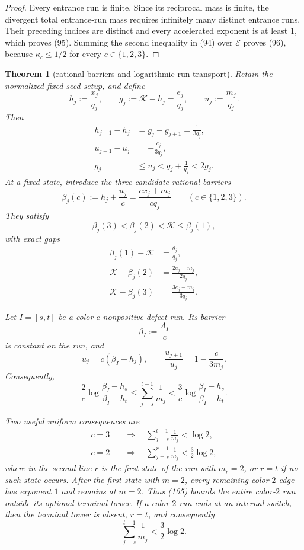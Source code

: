 \documentclass[11pt]{article}
\newtheorem{theorem}{Theorem}
\begin{document}
\begin{proof}
Every entrance run is finite.  Since its reciprocal mass is finite, the
divergent total entrance-run mass requires infinitely many distinct entrance
runs.  Their preceding indices are distinct and every accelerated exponent
is at least $1$, which proves (95).  Summing the second inequality in (94)
over $\mathcal E$ proves (96), because
$\kappa_c\leq1/2$ for every $c\in\{1,2,3\}$.
\end{proof}

\begin{theorem}[rational barriers and logarithmic run transport]
Retain the normalized fixed-seed setup, and define
\[
  h_j:=\frac{x_j}{q_j},
  \qquad
  g_j:=\mathcal K-h_j=\frac{e_j}{q_j},
  \qquad
  u_j:=\frac{m_j}{q_j}.
  \tag{97}
\]
Then
\[
\boxed{\begin{aligned}
  h_{j+1}-h_j&=g_j-g_{j+1}=\frac1{3q_j},\\
  u_{j+1}-u_j&=-\frac{c_j}{3q_j},\\
  g_j&\leq u_j<g_j+\frac1{q_j}<2g_j.
\end{aligned}}
\tag{98}
\]
At a fixed state, introduce the three candidate rational barriers
\[
  \beta_j(c):=h_j+\frac{u_j}{c}
  =\frac{cx_j+m_j}{cq_j}
  \qquad(c\in\{1,2,3\}).
  \tag{99}
\]
They satisfy
\[
\boxed{
  \beta_j(3)<\beta_j(2)<\mathcal K\leq\beta_j(1),}
\tag{100}
\]
with exact gaps
\[
\begin{aligned}
  \beta_j(1)-\mathcal K&=\frac{\theta_j}{q_j},\\
  \mathcal K-\beta_j(2)&=\frac{2e_j-m_j}{2q_j},\\
  \mathcal K-\beta_j(3)&=\frac{3e_j-m_j}{3q_j}.
\end{aligned}
\tag{101}
\]

Let $I=[s,t]$ be a color-$c$ nonpositive-defect run.  Its barrier
\[
  \beta_I:=\frac{\Lambda_I}{c}
  \tag{102}
\]
is constant on the run, and
\[
\boxed{
  u_j=c(\beta_I-h_j),
  \qquad
  \frac{u_{j+1}}{u_j}=1-\frac{c}{3m_j}.}
\tag{103}
\]
Consequently,
\[
\boxed{
  \frac2c\log\frac{\beta_I-h_s}{\beta_I-h_t}
  \leq\sum_{j=s}^{t-1}\frac1{m_j}
  <\frac3c\log\frac{\beta_I-h_s}{\beta_I-h_t}.}
\tag{104}
\]

Two useful uniform consequences are
\[
\boxed{\begin{aligned}
  c=3&\quad\Longrightarrow\quad
  \sum_{j=s}^{t-1}\frac1{m_j}<\log2,\\
  c=2&\quad\Longrightarrow\quad
  \sum_{j=s}^{r-1}\frac1{m_j}<\frac32\log2,
\end{aligned}}
\tag{105}
\]
where in the second line $r$ is the first state of the run with $m_r=2$,
or $r=t$ if no such state occurs.  After the first state with $m=2$, every
remaining color-$2$ edge has exponent $1$ and remains at $m=2$.  Thus (105)
bounds the entire color-$2$ run outside its optional terminal tower.  If a
color-$2$ run ends at an internal switch, then the terminal tower is absent,
$r=t$, and consequently
\[
\boxed{
  \sum_{j=s}^{t-1}\frac1{m_j}<\frac32\log2.}
\tag{105a}
\]


\end{theorem}
\end{document}
